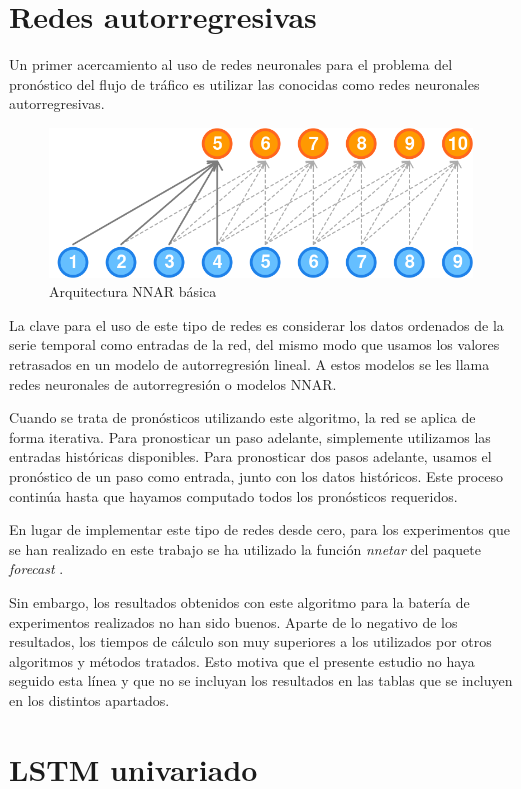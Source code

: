 \documentclass[]{book}
\begin{document}
\section{Redes autorregresivas}\label{redes-autorregresivas}

Un primer acercamiento al uso de redes neuronales para el problema del
pronóstico del flujo de tráfico es utilizar las conocidas como redes
neuronales autorregresivas.

\begin{figure}[H]

{\centering \includegraphics[width=0.4\linewidth]{images/nnar.simple} 

}

\caption{Arquitectura NNAR básica}\label{fig:NNAR-basic}
\end{figure}

La clave para el uso de este tipo de redes es considerar los datos
ordenados de la serie temporal como entradas de la red, del mismo modo
que usamos los valores retrasados en un modelo de autorregresión lineal.
A estos modelos se les llama redes neuronales de autorregresión o
modelos NNAR.

Cuando se trata de pronósticos utilizando este algoritmo, la red se
aplica de forma iterativa. Para pronosticar un paso adelante,
simplemente utilizamos las entradas históricas disponibles. Para
pronosticar dos pasos adelante, usamos el pronóstico de un paso como
entrada, junto con los datos históricos. Este proceso continúa hasta que
hayamos computado todos los pronósticos requeridos.

En lugar de implementar este tipo de redes desde cero, para los
experimentos que se han realizado en este trabajo se ha utilizado la
función \emph{nnetar} del paquete \emph{forecast} \citep{R-forecast}.

Sin embargo, los resultados obtenidos con este algoritmo para la batería
de experimentos realizados no han sido buenos. Aparte de lo negativo de
los resultados, los tiempos de cálculo son muy superiores a los
utilizados por otros algoritmos y métodos tratados. Esto motiva que el
presente estudio no haya seguido esta línea y que no se incluyan los
resultados en las tablas que se incluyen en los distintos apartados.

\section{LSTM univariado}\label{lstm-univariado}
\end{document}
